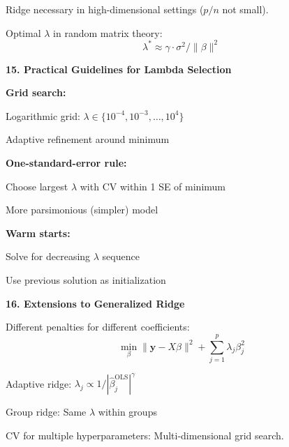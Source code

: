 \documentclass[12pt]{article}
\begin{document}
\begin{explanation}
Ridge necessary in high-dimensional settings ($p/n$ not small).

Optimal $\lambda$ in random matrix theory:
\[\lambda^* \approx \gamma \cdot \sigma^2 / \|\beta\|^2\]

\textbf{15. Practical Guidelines for Lambda Selection}

\textbf{Grid search:}

Logarithmic grid: $\lambda \in \{10^{-4}, 10^{-3}, \ldots, 10^{4}\}$

Adaptive refinement around minimum

\textbf{One-standard-error rule:}

Choose largest $\lambda$ with CV within 1 SE of minimum

More parsimonious (simpler) model

\textbf{Warm starts:}

Solve for decreasing $\lambda$ sequence

Use previous solution as initialization

\textbf{16. Extensions to Generalized Ridge}

Different penalties for different coefficients:
\[\min_\beta \|\mathbf{y} - X\beta\|^2 + \sum_{j=1}^{p}\lambda_j\beta_j^2\]

Adaptive ridge: $\lambda_j \propto 1/|\hat{\beta}_j^{\text{OLS}}|^{\gamma}$

Group ridge: Same $\lambda$ within groups

CV for multiple hyperparameters: Multi-dimensional grid search.

\end{explanation}
\end{document}

